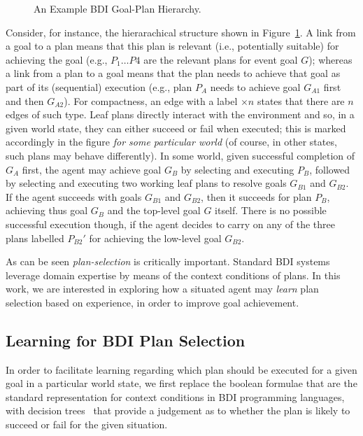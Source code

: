 \begin{figure}[t]
\begin{center}

\end{center}
\caption{An Example BDI Goal-Plan Hierarchy.}
\label{fig:T3}
\end{figure}

Consider, for instance, the hierarachical structure shown in Figure~\ref{fig:T3}.
A link from a goal to a plan means that this plan is relevant (i.e., potentially
suitable) for achieving the goal (e.g., $P_1 \ldots P4$ are the relevant plans
for event goal $G$); whereas a link from a plan to a goal means that the plan
needs to achieve that goal as part of its (sequential) execution (e.g., plan
$P_A$ needs to achieve goal $G_{A1}$ first and then $G_{A2}$).
For compactness, an edge with a label $\times n$ states that there are $n$ edges
of such type.
Leaf plans directly interact with the environment and so, in a given world state,
they can either succeed or fail when executed; this is marked accordingly in the
figure \emph{for some particular world} (of course, in other states, such plans
may behave differently).
In some world, given successful completion of $G_A$ first, the agent may achieve
goal $G_B$ by selecting and executing $P_B$, followed by selecting and executing two working leaf plans to resolve goals $G_{B1}$ and $G_{B2}$. If the agent
succeeds with goals $G_{B1}$ and $G_{B2}$, then it succeeds for plan $P_B$,
achieving thus goal $G_B$ and the top-level goal $G$ itself. There is no possible
successful execution though, if the agent decides to carry on any of the three
plans labelled $P_{B2}'$ for achieving the low-level goal $G_{B2}$.


As can be seen \textit{plan-selection} is critically important.
Standard BDI systems leverage domain
expertise by means of the context conditions of plans.
In this work, we are interested in exploring how a situated agent may
\emph{learn} plan selection based on experience, in order to improve goal
achievement. 


\subsection{Learning for BDI Plan Selection} \label{subsec:bdi_learning}
In order to facilitate learning regarding which plan should be
executed for a given goal in a particular world state, we first replace the
boolean formulae that are the standard representation for context
conditions in BDI programming languages, with decision
trees~\cite{Mitchell97:ML} that provide a judgement as to whether the
plan is likely to succeed or fail for the given situation. 

